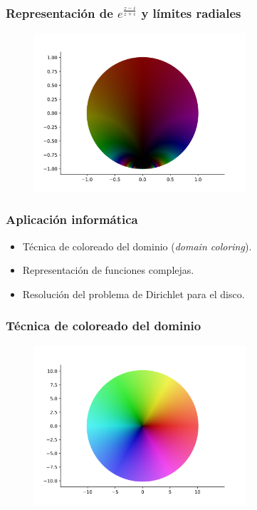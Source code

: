 \documentclass[spanish, a4paper, 12pt, final, slideColor, nototal, colorBG, pdf, noaccumulate, darkblue]{beamer}
\begin{document}
\begin{frame}
    \frametitle{Representación de $e^{\frac{z-i}{z+i}}$ y límites radiales}
    \begin{figure}[!htbp]
        \centering
        \includegraphics[width=0.7\textwidth]{../Aplicacion/e^((z-i):(z+i)).png}
        \label{fig:e^((z-i)/(z+i))}
    \end{figure}
\end{frame}

\begin{frame}
    \frametitle{Aplicación informática}
    \begin{itemize}
        \item Técnica de coloreado del dominio (\textit{domain coloring}).
        \item Representación de funciones complejas.
        \item Resolución del problema de Dirichlet para el disco.
    \end{itemize}
\end{frame}

\begin{frame}
    \frametitle{Técnica de coloreado del dominio}
    \begin{figure}[!htbp]
        \centering
        \includegraphics[width=0.7\textwidth]{../Aplicacion/z.png}
        \label{fig:z}
    \end{figure}
\end{frame}
\end{document}
